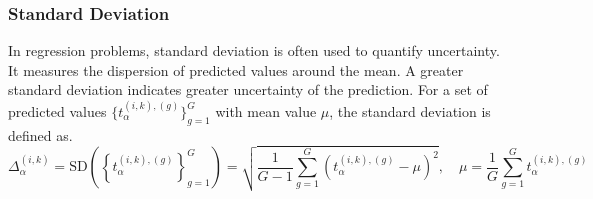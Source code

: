 \subsubsection{Standard Deviation}
In regression problems, standard deviation is often used to quantify uncertainty. It measures the dispersion of predicted values around the mean. A greater standard deviation indicates greater uncertainty of the prediction. For a set of predicted values $ \{t_{\alpha}^{(i,k),(g)} \}_{g=1}^G $ with mean value $\mu $, the standard deviation is defined as.
\begin{equation}
   \Delta_{\alpha}^{(i,k)}=\text{SD}\left(\left\{t_{\alpha}^{(i,k),(g)}\right\}_{g=1}^G\right)=\sqrt {\frac{1}{G-1 }\sum_{g=1}^G\left(t_{\alpha}^{(i,k),(g)}-\mu\right)^{2}},\quad\mu=\frac{1}{G}\sum_{g=1}^{G}{t_{\alpha}^{(i,k),(g)}}
    \label{eq:crowd.Eq.6.uncertainty.sd}
\end{equation}

